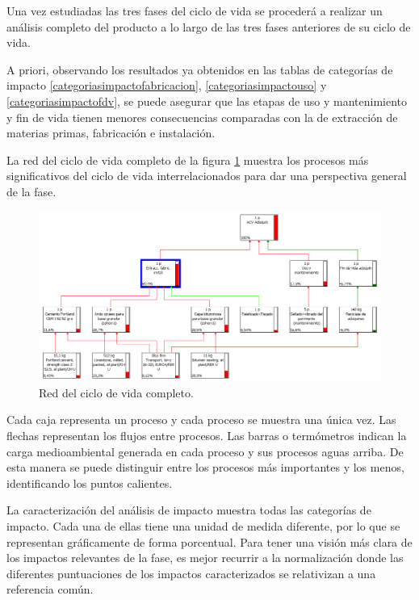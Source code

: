 Una vez estudiadas las tres fases del ciclo de vida se procederá a realizar un análisis completo del producto a lo largo de las tres fases anteriores de su ciclo de vida.

A priori, observando los resultados ya obtenidos en las tablas de categorías de impacto \ref{categoriasimpactofabricacion}, \ref{categoriasimpactouso} y \ref{categoriasimpactofdv}, se puede asegurar que las etapas de uso y mantenimiento y fin de vida tienen menores consecuencias comparadas con la de extracción de materias primas, fabricación e instalación.

La red del ciclo de vida completo de la figura \ref{fig:completo_red} muestra los procesos más significativos del ciclo de vida interrelacionados para dar una perspectiva general de la fase.

\begin{figure}[!htb]
\centering
\includegraphics[width=14cm]{img/completo_red.png}
\caption{Red del ciclo de vida completo.}
\label{fig:completo_red}
\end{figure}

Cada caja representa un proceso y cada proceso se muestra una única vez. Las flechas representan los flujos entre procesos. Las barras o termómetros indican la carga medioambiental generada en cada proceso y sus procesos aguas arriba. De esta manera se puede distinguir entre los procesos más importantes y los menos, identificando los puntos calientes.

La caracterización del análisis de impacto muestra todas las categorías de impacto. Cada una de ellas tiene una unidad de medida diferente, por lo que se representan gráficamente de forma porcentual. Para tener una visión más clara de los impactos relevantes de la fase, es mejor recurrir a la normalización donde las diferentes puntuaciones de los impactos caracterizados se relativizan a una referencia común.

